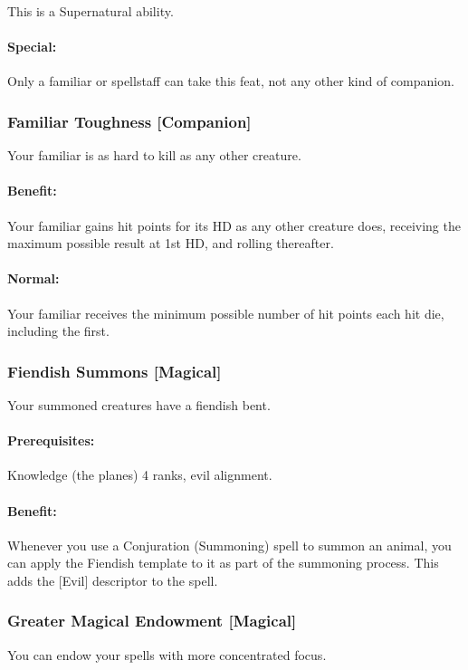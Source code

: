 This is a Supernatural ability.

\paragraph{Special:} Only a familiar or spellstaff can take this feat, not any other kind of companion.
\subsubsection[Familiar Toughness]{Familiar Toughness [Companion]}
\label{Feat:FamiliarToughness}
Your familiar is as hard to kill as any other creature.

\paragraph{Benefit:} Your familiar gains hit points for its HD as any other creature does, receiving the maximum possible result at 1st HD, and rolling thereafter.

\paragraph{Normal:} Your familiar receives the minimum possible number of hit points each hit die, including the first.
\subsubsection[Fiendish Summons]{Fiendish Summons [Magical]}
\label{Feat:FiendishSummons}
Your summoned creatures have a fiendish bent.

\paragraph{Prerequisites:} Knowledge (the planes) 4 ranks, evil alignment.

\paragraph{Benefit:} Whenever you use a Conjuration (Summoning) spell to summon an animal, you can apply the Fiendish template to it as part of the summoning process. This adds the [Evil] descriptor to the spell.
\subsubsection[Greater Magical Endowment]{Greater Magical Endowment [Magical]}
\label{Feat:GreaterMagicalEndowment}
You can endow your spells with more concentrated focus.

